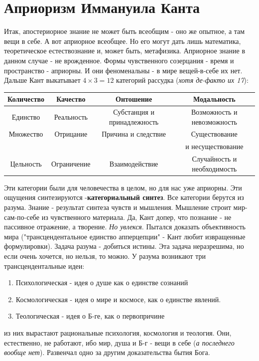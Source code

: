 \section{Априоризм Иммануила Канта}
Итак, апостериорное знание не может быть всеобщим - оно же опытное, а там вещи в себе. А вот априорное всеобщее. Но его могут дать лишь математика, теоретическое естествознание и, может быть, метафизика. Априорное знание в данном случае - не врожденное. Формы чувственного созерцания - время и пространство - априорны. И они феноменальны - в мире вещей-в-себе их нет. Дальше Кант выкатывает $4\times3=12$ категорий рассудка (\textit{хотя де-факто их 17}): 

\begin{tabular}{|c|c|c|c|}
\hline
\textbf{Количество}& \textbf{Качество}& \textbf{Онтошение}& \textbf{Модальность}\\
\hline
Единство&Реальность&Субстанция и принадлежность&Возможность и невозможность\\
\hline
Множество&Отрицание&Причина и следствие&Существование \\&&&и несуществование\\
\hline
Цельность&Ограничение&Взаимодействие&Случайность и необходимость\\
\hline
\end{tabular}
Эти категории были  для человечества в целом, но для нас уже априорны. Эти ощущения синтезируются -\textbf{категориальный синтез}.
Все категории берутся из разума. 
Знание - результат синтеза чувств и мышления. Мышление строит мир-сам-по-себе из чувственного материала. Да, Кант допер, что познание - не пассивное отражение, а творение. \textit{Но увлекся}. Пытался доказать объективность мира ("трансцендентальное единство апперцепции" - Кант любит извращенные формулировки). Задача разума - добиться истины. Эта задача неразрешима, но если очень хочется, но нельзя, то можно. У разума возникают три трансцендентальные идеи:
\begin{enumerate}
\item Психологическая - идея о душе как о единстве сознаний
\item Космологическая - идея о мире и космосе, как о единстве явлений.
\item Теологическая - идея о Б-ге, как о первопричине
\end{enumerate}
из них вырастают рациональные психология, космология и теология. Они, естественно, не работают, ибо мир, душа и Б-г - вещи в себе (\textit{а последнего вообще нет}). Развенчал одно за другим доказательства бытия Бога.

